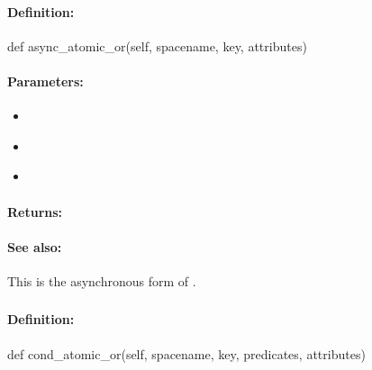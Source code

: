 \paragraph{Definition:}
\begin{pythoncode}
def async_atomic_or(self, spacename, key, attributes)
\end{pythoncode}

\paragraph{Parameters:}
\begin{itemize}[noitemsep]
\item {}\\

\item {}\\

\item {}\\

\end{itemize}

\paragraph{Returns:}


\paragraph{See also:}  This is the asynchronous form of .

\pagebreak
\subsubsection{}
\label{api:python:cond_atomic_or}


\paragraph{Definition:}
\begin{pythoncode}
def cond_atomic_or(self, spacename, key, predicates, attributes)
\end{pythoncode}

